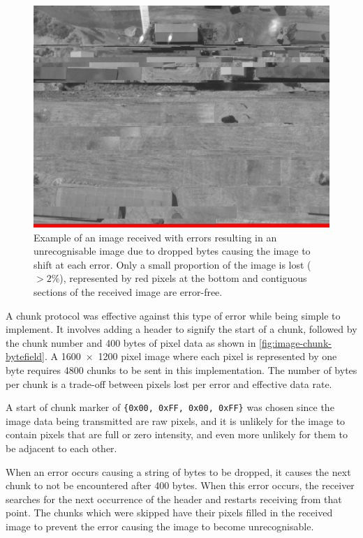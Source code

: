 \documentclass[a4paper,11pt]{article}
\begin{document}
\begin{figure}[H]
  \centering
  \includegraphics[width=\linewidth]{images/results/sheds_naive.png}
  \caption{Example of an image received with errors resulting in an unrecognisable image due to dropped bytes causing the image to shift at each error. Only a small proportion of the image is lost ($>2\%$), represented by red pixels at the bottom and contiguous sections of the received image are error-free.}
  \label{fig:image-sheds-error-demo}
\end{figure}

A chunk protocol was effective against this type of error while being simple to implement. It involves adding a header to signify the start of a chunk, followed by the chunk number and 400 bytes of pixel data as shown in \ref{fig:image-chunk-bytefield}. A \SI{1600x1200}{} pixel image where each pixel is represented by one byte requires 4800 chunks to be sent in this implementation. The number of bytes per chunk is a trade-off between pixels lost per error and effective data rate.

A start of chunk marker of \texttt{\{0x00, 0xFF, 0x00, 0xFF\}} was chosen since the image data being transmitted are raw pixels, and it is unlikely for the image to contain pixels that are full or zero intensity, and even more unlikely for them to be adjacent to each other.

When an error occurs causing a string of bytes to be dropped, it causes the next chunk to not be encountered after 400 bytes. When this error occurs, the receiver searches for the next occurrence of the header and restarts receiving from that point. The chunks which were skipped have their pixels filled in the received image to prevent the error causing the image to become unrecognisable.
\end{document}
